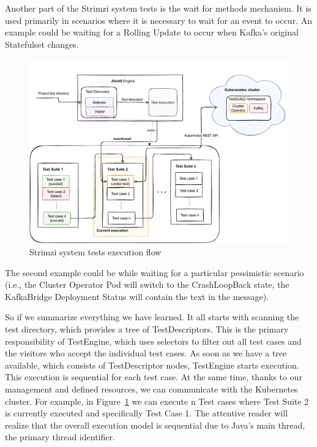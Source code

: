 Another part of the Strimzi system tests is the wait for methods mechanism.
It is used primarily in scenarios where it is necessary to wait for an event to occur.
An example could be waiting for a Rolling Update to occur when Kafka's original Statefulset changes. \begin{figure}[!ht]
    \centering
    \includegraphics[scale=0.70]{obrazky-figures/02-preliminaries/04-strimzi-system-tests/02d-strimzisystemtest-sequence-execution}
    \caption{Strimzi system tests execution flow}
    \label{02d:fig:strimzisysmtetest:execution}
\end{figure}
The second example could be while waiting for a particular pessimistic scenario (i.e., the Cluster Operator Pod will switch to the CrashLoopBack state, the KafkaBridge Deployment Status will contain the text in the message).

So if we summarize everything we have learned.
It all starts with scanning the test directory, which provides a tree of TestDescriptors.
This is the primary responsibility of TestEngine, which uses selectors to filter out all test cases and the visitors who accept the individual test cases.
As soon as we have a tree available, which consists of TestDescriptor nodes, TestEngine starts execution.
This execution is sequential for each test case.
At the same time, thanks to our management and defined resources, we can communicate with the Kubernetes cluster.
For example, in Figure~\ref{02d:fig:strimzisysmtetest:execution} we can execute n Test cases where Test Suite 2 is currently executed and specifically Test Case 1.
The attentive reader will realize that the overall execution model is sequential due to Java's main thread, the primary thread identifier.